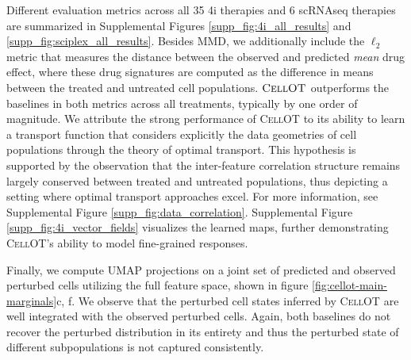 Different evaluation metrics across all 35 4i therapies and 6 scRNAseq therapies are summarized in Supplemental Figures \ref{supp_fig:4i_all_results} and \ref{supp_fig:sciplex_all_results}.
Besides MMD, we additionally include the $\ell_2$ metric that measures the distance between the observed and predicted \emph{mean} drug effect, where these drug signatures are computed as the difference in means between the treated and untreated cell populations.
$\textsc{CellOT}$ outperforms the baselines in both metrics across all treatments, typically by one order of magnitude.
We attribute the strong performance of \textsc{CellOT} to its ability to learn a transport function that considers explicitly the data geometries of cell populations through the theory of optimal transport.
This hypothesis is supported by the observation that the inter-feature correlation structure remains largely conserved between treated and untreated populations, thus depicting a setting where optimal transport approaches excel. For more information, see Supplemental Figure \ref{supp_fig:data_correlation}.
Supplemental Figure \ref{supp_fig:4i_vector_fields} visualizes the learned maps, %
further demonstrating \textsc{CellOT}'s ability to model fine-grained responses. %

Finally, we compute UMAP projections \cite{mcinnes2018} on a joint set of predicted and observed perturbed cells utilizing the full feature space, shown in figure \ref{fig:cellot-main-marginals}c, f.
We observe that the perturbed cell states inferred by \textsc{CellOT} are well integrated with the observed perturbed cells. Again, both baselines do not recover the perturbed distribution in its entirety %
and thus the perturbed state of different subpopulations is not captured consistently.

